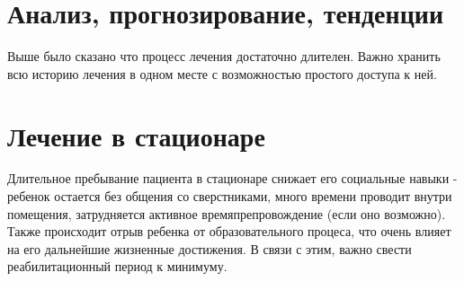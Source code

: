 \section{Анализ, прогнозирование, тенденции}
Выше было сказано что процесс лечения достаточно длителен. Важно хранить всю
историю лечения в одном месте с возможностью простого доступа к ней.

\section{Лечение в стационаре}
Длительное пребывание пациента в стационаре снижает его социальные навыки -
ребенок остается без общения со сверстниками, много времени проводит внутри
помещения, затрудняется активное времяпрепровождение (если оно возможно). Также
происходит отрыв ребенка от образовательного процеса, что очень влияет на его
дальнейшие жизненные достижения. В связи с этим, важно свести реабилитационный
период к минимуму.
